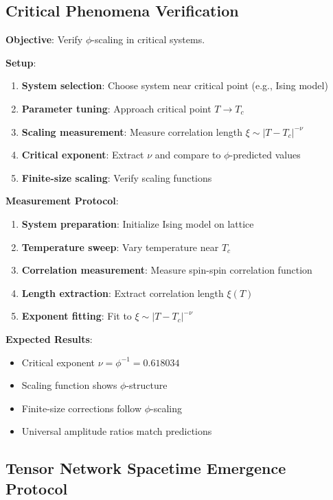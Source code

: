 \documentclass[11pt]{article}
\theoremstyle{definition}
\newcommand{\goldenratio}{\phi}
\begin{document}
\subsection{Critical Phenomena Verification}

\textbf{Objective}: Verify $\goldenratio$-scaling in critical systems.

\textbf{Setup}:
\begin{enumerate}
\item \textbf{System selection}: Choose system near critical point (e.g., Ising model)
\item \textbf{Parameter tuning}: Approach critical point $T \to T_c$
\item \textbf{Scaling measurement}: Measure correlation length $\xi \sim |T-T_c|^{-\nu}$
\item \textbf{Critical exponent}: Extract $\nu$ and compare to $\goldenratio$-predicted values
\item \textbf{Finite-size scaling}: Verify scaling functions
\end{enumerate}

\textbf{Measurement Protocol}:
\begin{enumerate}
\item \textbf{System preparation}: Initialize Ising model on lattice
\item \textbf{Temperature sweep}: Vary temperature near $T_c$
\item \textbf{Correlation measurement}: Measure spin-spin correlation function
\item \textbf{Length extraction}: Extract correlation length $\xi(T)$
\item \textbf{Exponent fitting}: Fit to $\xi \sim |T-T_c|^{-\nu}$
\end{enumerate}

\textbf{Expected Results}:
\begin{itemize}
\item Critical exponent $\nu = \goldenratio^{-1} = 0.618034$
\item Scaling function shows $\goldenratio$-structure
\item Finite-size corrections follow $\goldenratio$-scaling
\item Universal amplitude ratios match predictions
\end{itemize}

\subsection{Tensor Network Spacetime Emergence Protocol}
\end{document}

